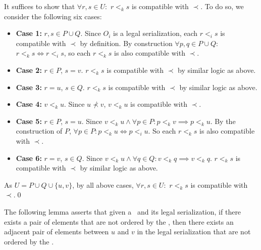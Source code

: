  It suffices to show that $\forall r,s \in U:$ $r<_k s$ is
   compatible with $\prec$. To do so, we consider the following six cases:

\begin{itemize}
\item {\bf Case 1:} $r,s\in P\cup Q$.  Since $O_i$ is a legal serialization,
each $r<_i s$ is compatible with $\prec$ by definition.  By
construction $\forall p,q\in P \cup Q:$ $r<_k s \Longleftrightarrow r<_i s$, so each $r<_k s$ is also compatible with $\prec$.

\item {\bf Case 2:} $r \in P$, $s = v$.  $r<_k s$ is compatible with $\prec$ by
similar logic as above.

\item {\bf Case 3:} $r = u$, $s \in Q$.  $r <_k s$ is compatible with $\prec$ by
 similar logic as above.

\item {\bf Case 4:} $v<_k u$.  Since $u\not\prec v$, $v<_k u$  is compatible with $\prec$. 

\item {\bf Case 5:} $r \in P$, $s = u$. Since $v <_{k} u \wedge \forall p \in P: p <_{k} v \implies p <_{k} u$. By the construction of $P$, $\forall p \in P: p <_{k} u \Longleftrightarrow p<_{i} u$. So each $r<_k s$ is also compatible with $\prec$.

\item {\bf Case 6:} $r = v$, $s \in Q$. Since $v <_{k} u \wedge \forall q \in Q: v <_{k} q \implies v <_{k} q$. $r <_k s$ is compatible with $\prec$ by
 similar logic as above.
\end{itemize}
As $U = P \cup Q \cup \{u,v\}$, by all above cases, $\forall r, s\in U:$ $r<_k s$ is compatible with $\prec$.\qed

The following lemma asserts that given a \RBo\ and its legal serialization, if there exists
a pair of elements that are not ordered by the \RBo, then there exists an adjacent
pair of elements between $u$ and $v$ in the legal serialization that are not ordered by the \RBo.


